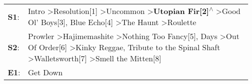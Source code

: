 \begin{supertabular}{p{0.03\textwidth}p{0.92\textwidth}}
 \textbf{S1}:  &                                                                Intro\textsuperscript{} \textgreater \enspace Resolution[1]\textsuperscript{} \textgreater \enspace Uncommon\textsuperscript{} \textgreater \enspace \textbf{Utopian Fir[2]\textsuperscript{$\wedge$}} \textgreater \enspace Good Ol' Boys[3]\textsuperscript{}, \enspace Blue Echo[4]\textsuperscript{} \textgreater \enspace The Haunt\textsuperscript{} \textgreater \enspace Roulette\textsuperscript{}  \enspace  \\
 \textbf{S2}:  &  Prowler\textsuperscript{} \textgreater \enspace Hajimemashite\textsuperscript{} \textgreater \enspace Nothing Too Fancy[5]\textsuperscript{},  Days\textsuperscript{} \textgreater \enspace Out Of Order[6]\textsuperscript{} \textgreater \enspace Kinky Reggae\textsuperscript{}, \enspace Tribute to the Spinal Shaft\textsuperscript{} \textgreater \enspace Walletsworth[7]\textsuperscript{} \textgreater \enspace Smell the Mitten[8]\textsuperscript{}  \enspace  \\
 \textbf{E1}:  &                                                                                                                                                                                                                                                                                                                                                                                                                                                 Get Down\textsuperscript{}  \enspace  \\
\end{supertabular}
